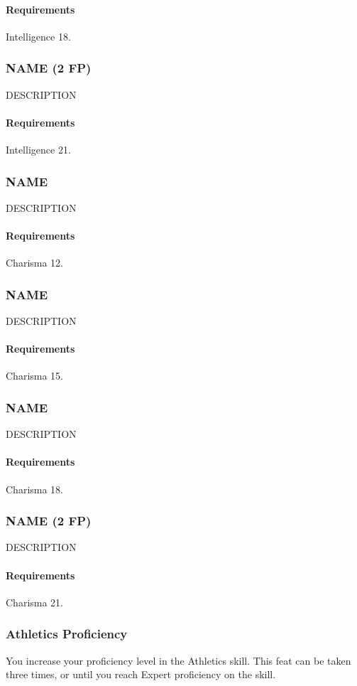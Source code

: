    \paragraph{Requirements} Intelligence 18.
\subsubsection{NAME (2 FP)} \label{feat::name}
    DESCRIPTION
    \paragraph{Requirements} Intelligence 21.
\subsubsection{NAME} \label{feat::name}
    DESCRIPTION
    \paragraph{Requirements} Charisma 12.
\subsubsection{NAME} \label{feat::name}
    DESCRIPTION
    \paragraph{Requirements} Charisma 15.
\subsubsection{NAME} \label{feat::name}
    DESCRIPTION
    \paragraph{Requirements} Charisma 18.
\subsubsection{NAME (2 FP)} \label{feat::name}
    DESCRIPTION
    \paragraph{Requirements} Charisma 21.
\subsubsection{Athletics Proficiency} \label{feat::athleticsprof}
    You increase your proficiency level in the Athletics skill.
    This feat can be taken three times, or until you reach Expert proficiency on the skill.
